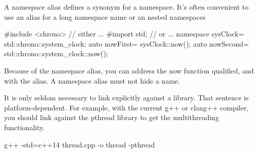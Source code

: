 
A namespace alias defines a synonym for a namespace. It’s often convenient to use an alias for a long namespace name or an nested namespaces

\begin{cpp}
#include <chrono> // either
...
#import std; // or
...
namespace sysClock= std::chrono::system_clock;
auto nowFirst= sysClock::now();
auto nowSecond= std::chrono::system_clock::now();
\end{cpp}

Because of the namespace alias, you can address the now function qualified, and with the alias. A namespace alias must not hide a name.



It is only seldom necessary to link explicitly against a library. That sentence is platform-dependent. For example, with the current g++ or clang++ compiler, you should link against the pthread library to get the multithreading functionality.

\begin{shell}
g++ -std=c++14 thread.cpp -o thread -pthread
\end{shell}
